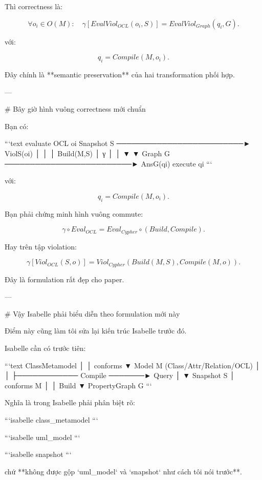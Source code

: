 Thì correctness là:

$$
\boxed{
\forall o_i\in O(M):
\quad
\gamma
\left[
EvalViol_{OCL}(o_i,S)
\right]
=
EvalViol_{Graph}
(q_i,G).
}
\tag{2}
$$

với:

$$
q_i=Compile(M,o_i).
$$

Đây chính là **semantic preservation** của hai transformation phối hợp.

---

# Bây giờ hình vuông correctness mới chuẩn

Bạn có:

```text
                         evaluate OCL oi
       Snapshot S  ─────────────────────────►  ViolS(oi)
           │                                      │
           │ Build(M,S)                           │ γ
           │                                      │
           ▼                                      ▼
       Graph G      ─────────────────────────► AnsG(qi)
                        execute qi
```

với:

$$
q_i=Compile(M,o_i).
$$

Bạn phải chứng minh hình vuông commute:

$$
\boxed{
\gamma\circ Eval_{OCL}
=
Eval_{Cypher}\circ(Build,Compile).
}
$$

Hay trên tập violation:

$$
\boxed{
\gamma[Viol_{OCL}(S,o)]
=
Viol_{Cypher}(Build(M,S),Compile(M,o)).
}
$$

Đây là formulation rất đẹp cho paper.

---

# Vậy Isabelle phải biểu diễn theo formulation mới này

Điểm này cũng làm tôi sửa lại kiến trúc Isabelle trước đó.

Isabelle cần có trước tiên:

```text
ClassMetamodel
      │
      │ conforms
      ▼
    Model M
(Class/Attr/Relation/OCL)
      │
      │
      ├──────────── Compile ───────► Query
      │
      ▼
  Snapshot S
      │ conforms M
      │
      │ Build
      ▼
  PropertyGraph G
```

Nghĩa là trong Isabelle phải phân biệt rõ:

```isabelle
class_metamodel
```

```isabelle
uml_model
```

```isabelle
snapshot
```

chứ **không được gộp `uml_model` và `snapshot` như cách tôi nói trước**.

